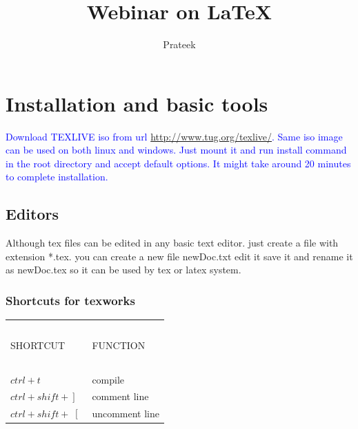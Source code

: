 \documentclass[twoside]{book}
\title{Webinar on \LaTeX}
\author{Prateek}
\begin{document}


\maketitle


%
	\newpage
	\tableofcontents
	\newpage
	\listoffigures
	\newpage
	\listoftables
%	
%	
%	
\section{Installation and basic tools}

\textcolor{blue}{Download TEXLIVE iso  from url \url{http://www.tug.org/texlive/}. Same iso image can be used on both linux and windows. Just mount it and run install command in the root directory and accept default options. It might take around 20 minutes to complete installation.}


\subsection{Editors}
Although tex files can be edited in any basic text editor. just create a file with extension *.tex. you can create a new file newDoc.txt edit it save it and rename it as newDoc.tex so it can be used by tex or latex system.


{
}

\subsubsection{Shortcuts for texworks}
\begin{table}[!htbp]
\begin{tabular}{p{.4\linewidth}|p{.4\linewidth}}
\hline
\ &\ \\
SHORTCUT&FUNCTION\\
\ &\ \\
\hline
$ctrl+t$&compile\\

$\left. ctrl+shift+\right]$& comment line\\
$\left. ctrl+shift+\right[$& uncomment line\\
\hline
\end{tabular}
\end{table}
\end{document}
